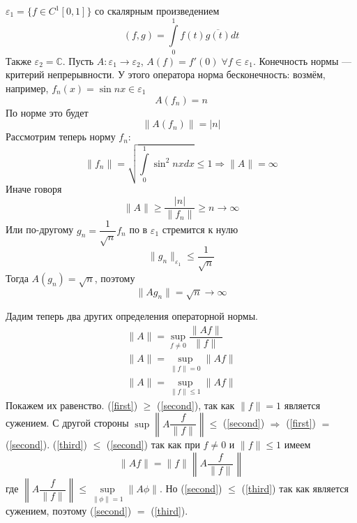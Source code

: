 \documentclass[14pt]{extarticle}
\begin{document}
\begin{Prim}
	$\varepsilon_1 = \{f \in C^1[0,1]\}$ со скалярным произведением
	$$
	(f, g) = \int\limits_0^1 f(t) \overline{g(t)} dt
	$$
	Также $\varepsilon_2 = \mathbb C$.
	Пусть $A : \varepsilon_1 \to \varepsilon_2$, $A(f)=f'(0)\; \forall f \in \varepsilon_1$.
	Конечность нормы --- критерий непрерывности.
	У этого оператора норма бесконечность: возмём, например, $f_n(x) = \sin{nx} 	\in \varepsilon_1$
	$$
	A(f_n) = n
	$$
	По норме это будет
	$$
	\|A(f_n)\| = |n|
	$$
	Рассмотрим теперь норму $f_n$:
	$$
	\|f_n\| = \sqrt{ \int \limits_0^1 \sin^2{nx} dx} \le 1 \Rightarrow \|A\| = \infty
	$$
	Иначе говоря
	$$
	\|A\| \ge \dfrac{|n|}{\|f_n\|} \ge n \to \infty
	$$
	Или по-другому $g_n = \dfrac{1}{\sqrt{n}} f_n$ по в $\varepsilon_1$ стремится к 	нулю
	$$
	\|g_n\|_{\varepsilon_1} \le \dfrac{1}{\sqrt{n}}
	$$
	Тогда $A(g_n) = \sqrt{n}$, поэтому
	$$
	\|Ag_n\| = \sqrt{n} \to \infty
	$$
\end{Prim}

Дадим теперь два других определения операторной нормы.
\begin{gather}
	\label{first}
	\|A\| = \sup\limits_{f \ne 0}{\dfrac{\|Af\|}{\|f\|}}\\
	\label{second}
	\|A\| = \sup\limits_{\|f\| = 0} \|Af\|\\
	\label{third}
	\|A\| = \sup\limits_{\|f\| \le 1}\|Af\|
\end{gather}
Покажем их равенство.
(\ref{first}) $\ge$ (\ref{second}), так как $\|f\| = 1$ является сужением.
С другой стороны $\sup\left\|A\dfrac{f}{\|f\|}\right\| \le $ (\ref{second}) $\Rightarrow$  (\ref{first}) $=$ (\ref{second}).
(\ref{third}) $\le$ (\ref{second}) так как при $f \ne 0$ и $\|f\| \le 1$ имеем 
$$
\|Af\| =\|f\| \left\|A\dfrac{f}{\|f\|}\right\|
$$
где $\left\|A\dfrac{f}{\|f\|}\right\| \le \sup\limits_{\|\phi\| = 1} \|A\phi\|$.
Но (\ref{second}) $\le$ (\ref{third}) так как является сужением, поэтому (\ref{second}) $=$ (\ref{third}).
\end{document}
